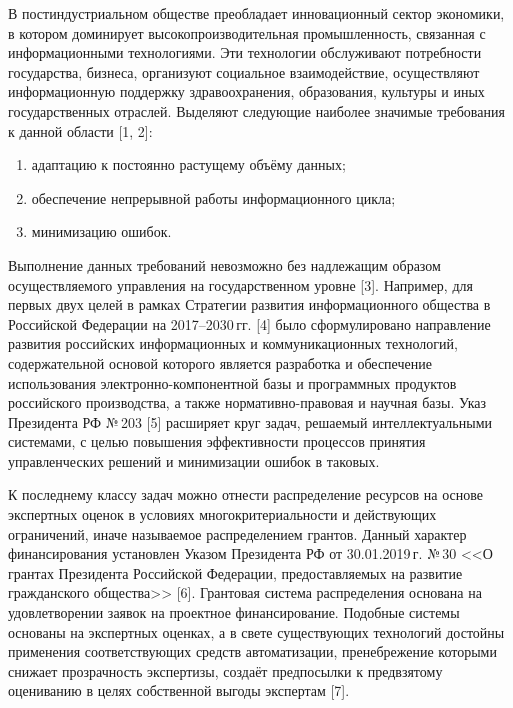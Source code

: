 

\makeProcTitleRazdel
{}

В постиндустриальном обществе преобладает инновационный сектор экономики, в котором доминирует высокопроизводительная промышленность, связанная с информационными технологиями. Эти технологии обслуживают потребности государства, бизнеса, организуют социальное взаимодействие, осуществляют информационную поддержку здравоохранения, образования, культуры и иных государственных отраслей. Выделяют следующие наиболее значимые требования к данной области [1, 2]:
\begin{enumerate}[noitemsep]\vspace{-8pt}
      \item адаптацию к постоянно растущему объёму данных;
      \item обеспечение непрерывной работы информационного цикла;
      \item минимизацию ошибок.
\end{enumerate}\vspace{-8pt}

Выполнение данных требований невозможно без надлежащим образом осуществляемого управления на государственном уровне [3]. Например, для первых двух целей в рамках Стратегии развития информационного общества в Российской Федерации на 2017--2030\,гг. [4] было сформулировано направление развития российских информационных и коммуникационных технологий, содержательной основой которого является разработка и обеспечение использования электронно-компонентной базы и программных продуктов российского производства, а также нормативно-правовая и научная базы. Указ Президента РФ №\,203 [5] расширяет круг задач, решаемый интеллектуальными системами, с целью повышения эффективности процессов принятия управленческих решений и минимизации ошибок в таковых.

К последнему классу задач можно отнести распределение ресурсов на основе экспертных оценок в условиях многокритериальности и действующих ограничений, иначе называемое распределением грантов. Данный характер финансирования установлен Указом Президента РФ от 30.01.2019\,г. №\,30 <<О грантах Президента Российской Федерации, предоставляемых на развитие гражданского общества>> [6]. Грантовая система распределения основана на удовлетворении заявок на проектное финансирование. Подобные системы основаны на экспертных оценках, а в свете существующих технологий достойны применения соответствующих средств автоматизации, пренебрежение которыми снижает прозрачность экспертизы, создаёт предпосылки к предвзятому оцениванию в целях собственной выгоды экспертам [7].

